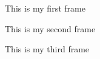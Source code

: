 \documentclass{beamer}
\begin{document}
\begin{frame}
This is my first frame
\end{frame}

\begin{frame}
This is my second frame
\end{frame}

\begin{frame}
This is my third frame
\end{frame}
\end{document}

